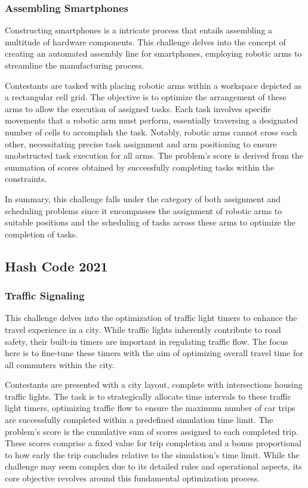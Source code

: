 \subsubsection*{Assembling Smartphones}
\label{subsubsec:hashcode-2020-final}

Constructing smartphones is a intricate process that entails assembling a
multitude of hardware components. This challenge delves into the concept of
creating an automated assembly line for smartphones, employing robotic arms to
streamline the manufacturing process.

Contestants are tasked with placing robotic arms within a workspace depicted as
a rectangular cell grid. The objective is to optimize the arrangement of these
arms to allow the execution of assigned tasks. Each task involves specific
movements that a robotic arm must perform, essentially traversing a designated
number of cells to accomplish the task. Notably, robotic arms cannot cross each
other, necessitating precise task assignment and arm positioning to ensure
unobstructed task execution for all arms. The problem's score is derived from
the summation of scores obtained by successfully completing tasks within the
constraints.

In summary, this challenge falls under the category of both assignment and
scheduling problems since it encompasses the assignment of robotic arms to
suitable positions and the scheduling of tasks across these arms to optimize the
completion of tasks.

\subsection{Hash Code 2021}
\label{subsec:hashcode-2021}

\subsubsection*{Traffic Signaling}
\label{subsubsec:hashcode-2021-qualification}

This challenge delves into the optimization of traffic light timers to enhance
the travel experience in a city. While traffic lights inherently contribute to
road safety, their built-in timers are important in regulating traffic flow. The
focus here is to fine-tune these timers with the aim of optimizing overall
travel time for all commuters within the city.

Contestants are presented with a city layout, complete with intersections
housing traffic lights. The task is to strategically allocate time intervals to
these traffic light timers, optimizing traffic flow to ensure the maximum number
of car trips are successfully completed within a predefined simulation time
limit. The problem's score is the cumulative sum of scores assigned to each
completed trip. These scores comprise a fixed value for trip completion and a
bonus proportional to how early the trip concludes relative to the simulation's
time limit. While the challenge may seem complex due to its detailed rules and
operational aspects, its core objective revolves around this fundamental
optimization process.

